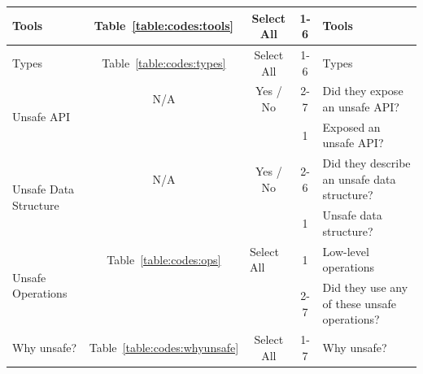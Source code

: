 \begin{tabular}{|l|c|c|c|p{5cm}|}
Tools                                      & Table~\ref{table:codes:tools}       & Select All                      & 1-6             & Tools                                                                                                                      \\ \hline\hline
Types                                      & Table~\ref{table:codes:types}       & Select All                      & 1-6             & Types                                                                                                                      \\ \hline\hline
\multirow{2}{*}{Unsafe API}                & N/A                                 & Yes / No                        & 2-7             & Did they expose an unsafe API?                                                                                             \\ \cline{4-5} 
                                           &                                     &                                 & 1               & Exposed an unsafe API?                                                                                                     \\ \hline\hline
\multirow{2}{*}{Unsafe Data Structure}     & N/A                                 & Yes / No                        & 2-6             & Did they describe an unsafe data structure?                                                                                \\ \cline{4-5} 
                                           &                                     &                                 & 1               & Unsafe data structure?                                                                                                     \\ \hline\hline
\multirow{2}{*}{Unsafe Operations}         & Table~\ref{table:codes:ops}               & \multicolumn{1}{l|}{Select All} & 1               & Low-level operations                                                                                                       \\ \cline{4-5} 
                                           &                                     & \multicolumn{1}{l|}{}           & 2-7             & Did they use any of these unsafe operations?                                                                               \\ \hline\hline
Why unsafe?                                & Table~\ref{table:codes:whyunsafe}   & Select All                      & 1-7             & Why unsafe?                                                                                                                \\ \hline
\end{tabular}